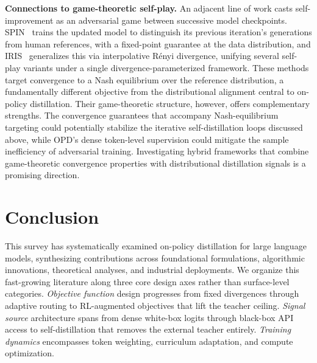 \documentclass{article} %
\begin{document}
\textbf{Connections to game-theoretic self-play.} An adjacent line of work casts self-improvement as an adversarial game between successive model checkpoints. SPIN~\citep{2401.01335} trains the updated model to distinguish its previous iteration's generations from human references, with a fixed-point guarantee at the data distribution, and IRIS~\citep{2604.20933} generalizes this via interpolative R\'{e}nyi divergence, unifying several self-play variants under a single divergence-parameterized framework. These methods target convergence to a Nash equilibrium over the reference distribution, a fundamentally different objective from the distributional alignment central to on-policy distillation. Their game-theoretic structure, however, offers complementary strengths. The convergence guarantees that accompany Nash-equilibrium targeting could potentially stabilize the iterative self-distillation loops discussed above, while OPD's dense token-level supervision could mitigate the sample inefficiency of adversarial training. Investigating hybrid frameworks that combine game-theoretic convergence properties with distributional distillation signals is a promising direction.

\section{Conclusion}
\label{sec:conclusion}

This survey has systematically examined on-policy distillation for large language models, synthesizing contributions across foundational formulations, algorithmic innovations, theoretical analyses, and industrial deployments. We organize this fast-growing literature along three core design axes rather than surface-level categories. \emph{Objective function} design progresses from fixed divergences through adaptive routing to RL-augmented objectives that lift the teacher ceiling. \emph{Signal source} architecture spans from dense white-box logits through black-box API access to self-distillation that removes the external teacher entirely. \emph{Training dynamics} encompasses token weighting, curriculum adaptation, and compute optimization.
\end{document}
